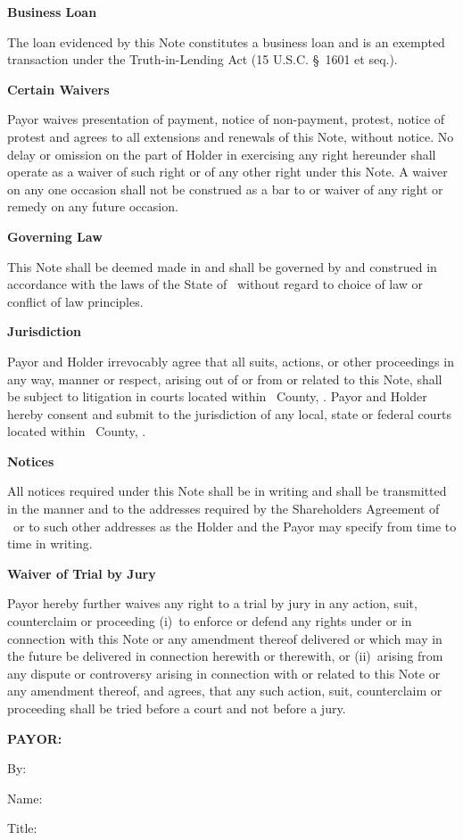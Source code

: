 \par\medskip\noindent\textbf{Business Loan}\par
The loan evidenced by this Note constitutes a business loan and is an exempted transaction
under the Truth-in-Lending Act (15 U.S.C. \S~1601 et seq.).

\par\medskip\noindent\textbf{Certain Waivers}\par
Payor waives presentation of payment, notice of non-payment, protest, notice of protest and
agrees to all extensions and renewals of this Note, without notice. No delay or omission on
the part of Holder in exercising any right hereunder shall operate as a waiver of such right
or of any other right under this Note. A waiver on any one occasion shall not be construed as
a bar to or waiver of any right or remedy on any future occasion.

\par\medskip\noindent\textbf{Governing Law}\par
This Note shall be deemed made in and shall be governed by and construed in accordance with
the laws of the State of \companyState\ without regard to choice of law or conflict of law
principles.

\par\medskip\noindent\textbf{Jurisdiction}\par
Payor and Holder irrevocably agree that all suits, actions, or other proceedings in any way,
manner or respect, arising out of or from or related to this Note, shall be subject to
litigation in courts located within \venueCounty\ County, \companyState. Payor and Holder
hereby consent and submit to the jurisdiction of any local, state or federal courts located
within \venueCounty\ County, \companyState.

\par\medskip\noindent\textbf{Notices}\par
All notices required under this Note shall be in writing and shall be transmitted in the
manner and to the addresses required by the Shareholders Agreement of \companyName\ or to
such other addresses as the Holder and the Payor may specify from time to time in writing.

\par\medskip\noindent\textbf{Waiver of Trial by Jury}\par
Payor hereby further waives any right to a trial by jury in any action, suit, counterclaim or
proceeding (i)~to enforce or defend any rights under or in connection with this Note or any
amendment thereof delivered or which may in the future be delivered in connection herewith or
therewith, or (ii)~arising from any dispute or controversy arising in connection with or
related to this Note or any amendment thereof, and agrees, that any such action, suit,
counterclaim or proceeding shall be tried before a court and not before a jury.

\bigskip
\noindent \textbf{PAYOR:}

\par\medskip\noindent \payorName

\bigskip
\noindent By: \sigline

\par\medskip\noindent Name: \fillin[3in]

\par\medskip\noindent Title: \fillin[3in]
